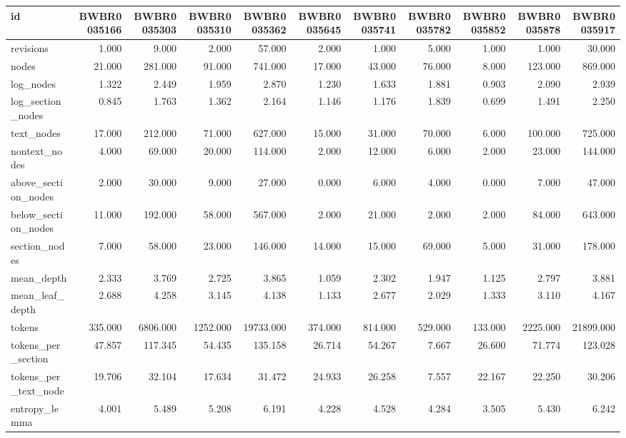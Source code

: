 \begin{tabular}{lrrrrrrrrrr}
\toprule
id & BWBR0035166 & BWBR0035303 & BWBR0035310 & BWBR0035362 & BWBR0035645 & BWBR0035741 & BWBR0035782 & BWBR0035852 & BWBR0035878 & BWBR0035917 \\
\midrule
revisions & 1.000 & 9.000 & 2.000 & 57.000 & 2.000 & 1.000 & 5.000 & 1.000 & 1.000 & 30.000 \\
\cline{1-11}
nodes & 21.000 & 281.000 & 91.000 & 741.000 & 17.000 & 43.000 & 76.000 & 8.000 & 123.000 & 869.000 \\
\cline{1-11}
log\_nodes & 1.322 & 2.449 & 1.959 & 2.870 & 1.230 & 1.633 & 1.881 & 0.903 & 2.090 & 2.939 \\
\cline{1-11}
log\_section\_nodes & 0.845 & 1.763 & 1.362 & 2.164 & 1.146 & 1.176 & 1.839 & 0.699 & 1.491 & 2.250 \\
\cline{1-11}
text\_nodes & 17.000 & 212.000 & 71.000 & 627.000 & 15.000 & 31.000 & 70.000 & 6.000 & 100.000 & 725.000 \\
\cline{1-11}
nontext\_nodes & 4.000 & 69.000 & 20.000 & 114.000 & 2.000 & 12.000 & 6.000 & 2.000 & 23.000 & 144.000 \\
\cline{1-11}
above\_section\_nodes & 2.000 & 30.000 & 9.000 & 27.000 & 0.000 & 6.000 & 4.000 & 0.000 & 7.000 & 47.000 \\
\cline{1-11}
below\_section\_nodes & 11.000 & 192.000 & 58.000 & 567.000 & 2.000 & 21.000 & 2.000 & 2.000 & 84.000 & 643.000 \\
\cline{1-11}
section\_nodes & 7.000 & 58.000 & 23.000 & 146.000 & 14.000 & 15.000 & 69.000 & 5.000 & 31.000 & 178.000 \\
\cline{1-11}
mean\_depth & 2.333 & 3.769 & 2.725 & 3.865 & 1.059 & 2.302 & 1.947 & 1.125 & 2.797 & 3.881 \\
\cline{1-11}
mean\_leaf\_depth & 2.688 & 4.258 & 3.145 & 4.138 & 1.133 & 2.677 & 2.029 & 1.333 & 3.110 & 4.167 \\
\cline{1-11}
tokens & 335.000 & 6806.000 & 1252.000 & 19733.000 & 374.000 & 814.000 & 529.000 & 133.000 & 2225.000 & 21899.000 \\
\cline{1-11}
tokens\_per\_section & 47.857 & 117.345 & 54.435 & 135.158 & 26.714 & 54.267 & 7.667 & 26.600 & 71.774 & 123.028 \\
\cline{1-11}
tokens\_per\_text\_node & 19.706 & 32.104 & 17.634 & 31.472 & 24.933 & 26.258 & 7.557 & 22.167 & 22.250 & 30.206 \\
\cline{1-11}
entropy\_lemma & 4.001 & 5.489 & 5.208 & 6.191 & 4.228 & 4.528 & 4.284 & 3.505 & 5.430 & 6.242 \\

\end{tabular}
